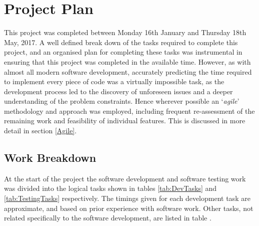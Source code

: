 
\chapter[Project Plan]{Project Plan} %

\label{Chapter3} %


This project was completed between Monday 16th January and Thursday 18th May, 2017. A well defined break down of the tasks required to complete this project, and an organised plan for completing these tasks was instrumental in ensuring that this project was completed in the available time. However, as with almost all modern software development, accurately predicting the time required to implement every piece of code was a virtually impossible task, as the development process led to the discovery of unforeseen issues and a deeper understanding of the problem constraints. Hence wherever possible an `\textit{agile}' methodology and approach was employed, including frequent re-assessment of the remaining work and feasibility of individual features. This is discussed in more detail in section \ref{Agile}.


\section{Work Breakdown}
At the start of the project the software development and software testing work was divided into the logical tasks shown in tables \ref{tab:DevTasks} and \ref{tab:TestingTasks} respectively. The timings given for each development task are approximate, and based on prior experience with software work. Other tasks, not related specifically to the software development, are listed in table .

